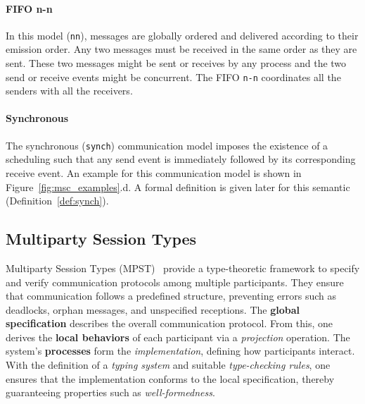 \paragraph{FIFO n-n}
In this model (\verb|nn|), messages are globally ordered and delivered according to 
their emission order. Any two messages must be received in the same order 
as they are sent. These two messages might be sent or receives by any process 
and the two send or receive events might be concurrent. The FIFO \verb|n-n| 
coordinates all the senders with all the receivers.


\paragraph{Synchronous}
The synchronous (\verb|synch|) communication model imposes 
the existence of a scheduling such that any send event is 
immediately followed by its corresponding receive event. 
An example for this communication model is shown in Figure~\ref{fig:msc_examples}.d.
A formal definition is given later for this semantic (Definition~\ref{def:synch}).

\subsection{Multiparty Session Types}
Multiparty Session Types (MPST)~\cite{honda2008multiparty} 
provide a type-theoretic framework to specify and verify communication 
protocols among multiple participants. They ensure that communication 
follows a predefined structure, preventing errors such as deadlocks, 
orphan messages, and unspecified receptions. The 
\textbf{global specification} describes the overall communication 
protocol. From this, one derives the \textbf{local behaviors} of each 
participant via a \emph{projection} operation. The system's 
\textbf{processes} form the \emph{implementation}, defining how 
participants interact. With the definition of a \emph{typing system} 
and suitable \emph{type-checking rules}, one ensures that the 
implementation conforms to the local specification, thereby 
guaranteeing properties such as \emph{well-formedness}.  

